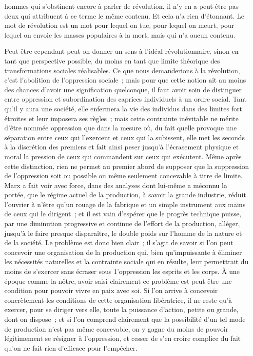 \documentclass[french,twoside]{book} %
\begin{document}
hommes qui s'obstinent encore à parler de révolution, il n'y en a peut-être pas deux qui attribuent à ce terme le même contenu. Et cela n'a rien d'étonnant. Le mot de révolution est un mot pour lequel on tue, pour lequel on meurt, pour lequel on envoie les masses populaires à la mort, mais qui n'a aucun contenu.\par
Peut-être cependant peut-on donner un sens à l'idéal révolutionnaire, sinon en tant que perspective possible, du moins en tant que limite théorique des transformations sociales réalisables. Ce que nous demanderions à la révolution, c'est l'abolition de l'oppression sociale ; mais pour que cette notion ait au moins des chances d'avoir une signification quelconque, il faut avoir soin de distinguer entre oppression et subordination des caprices individuels à un ordre social. Tant qu'il y aura une société, elle enfermera la vie des individus dans des limites fort étroites et leur imposera ses règles ; mais cette contrainte inévitable ne mérite d'être nommée oppression que dans la mesure où, du fait quelle provoque une séparation entre ceux qui l'exercent et ceux qui la subissent, elle met les seconds à la discrétion des premiers et fait ainsi peser jusqu’à l'écrasement physique et moral la pression de ceux qui commandent sur ceux qui exécutent. Même après cette distinction, rien ne permet au premier abord de supposer que la suppression de l'oppression soit ou possible ou même seulement concevable à titre de limite. Marx a fait voir avec force, dans des analyses dont lui-même a méconnu la portée, que le régime actuel de la production, à savoir la grande industrie, réduit l'ouvrier à n'être qu'un rouage de la fabrique et un simple instrument aux mains de ceux qui le dirigent ; et il est vain d'espérer que le progrès technique puisse, par une diminution progressive et continue de l'effort de la production, alléger, jusqu'à le faire presque disparaître, le double poids sur l'homme de la nature et de la société. Le problème est donc bien clair ; il s'agit de savoir si l'on peut concevoir une organisation de la production qui, bien qu'impuissante à éliminer les nécessités naturelles et la contrainte sociale qui en résulte, leur permettrait du moins de s'exercer sans écraser sous 1'oppression les esprits et les corps. À une époque comme la nôtre, avoir saisi clairement ce problème est peut-être une condition pour pouvoir vivre en paix avec soi. Si l'on arrive à concevoir concrètement les conditions de cette organisation libératrice, il ne reste qu'à exercer, pour se diriger vers elle, toute la puissance d'action, petite ou grande, dont on dispose ; et si l'on comprend clairement que la possibilité d'un tel mode de production n'est pas même concevable, on y gagne du moins de pouvoir légitimement se résigner à l'oppression, et cesser de s'en croire complice du fait qu'on ne fait rien d'efficace pour l'empêcher.\par
\end{document}
